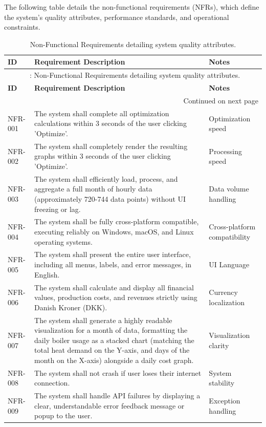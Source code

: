\hspace*{1cm}The following table details the non-functional requirements (NFRs), which define the system's quality attributes, performance standards, and operational constraints.

\vspace{0.5cm}

\begin{longtable}{|p{2cm}|p{8cm}|p{4cm}|}
\caption{Non-Functional Requirements detailing system quality attributes.}
\label{tab:non_functional_requirements} \\
\hline
\textbf{ID} & \textbf{Requirement Description} & \textbf{Notes} \\
\hline
\endfirsthead

\multicolumn{3}{c}{{\tablename\ \thetable{}: Non-Functional Requirements detailing system quality attributes.}} \\
\hline
\textbf{ID} & \textbf{Requirement Description} & \textbf{Notes} \\
\hline
\endhead

\hline \multicolumn{3}{|r|}{{Continued on next page}} \\ \hline
\endfoot

\hline
\endlastfoot

NFR-001 & The system shall complete all optimization calculations within 3 seconds of the user clicking 'Optimize'. & Optimization speed \\
\hline
NFR-002 & The system shall completely render the resulting graphs within 3 seconds of the user clicking 'Optimize'. & Processing speed \\
\hline
NFR-003 & The system shall efficiently load, process, and aggregate a full month of hourly data (approximately 720-744 data points) without UI freezing or lag. & Data volume handling \\
\hline
NFR-004 & The system shall be fully cross-platform compatible, executing reliably on Windows, macOS, and Linux operating systems. & Cross-platform compatibility \\
\hline
NFR-005 & The system shall present the entire user interface, including all menus, labels, and error messages, in English. & UI Language \\
\hline
NFR-006 & The system shall calculate and display all financial values, production costs, and revenues strictly using Danish Kroner (DKK). & Currency localization \\
\hline
NFR-007 & The system shall generate a highly readable visualization for a month of data, formatting the daily boiler usage as a stacked chart (matching the total heat demand on the Y-axis, and days of the month on the X-axis) alongside a daily cost graph. & Visualization clarity \\
\hline
NFR-008 & The system shall not crash if user loses their internet connection. & System stability \\
\hline
NFR-009 & The system shall handle API failures by displaying a clear, understandable error feedback message or popup to the user. & Exception handling \\
\end{longtable}

